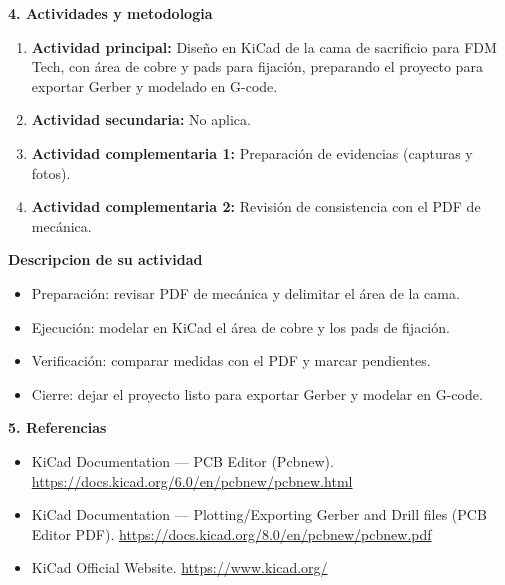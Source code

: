\documentclass[11pt,a4paper]{article}
\newcommand{\ActividadPrincipal}{Dise\~no en KiCad de la cama de sacrificio para FDM Tech, con \'area de cobre y pads para fijaci\'on, preparando el proyecto para exportar Gerber y modelado en G-code}
\newcommand{\ActividadSecundaria}{No aplica}
\newcommand{\SectionTitle}[1]{%
  \vspace{1mm}
  {\Large\bfseries\color{FDMblue}#1}\par
  \vspace{1mm}
}
\newcommand{\SubTitle}[1]{%
  {\bfseries\color{FDMdark}#1}\par
}
\newcommand{\SafeItem}{\Needspace{3\baselineskip}\item}
\newcommand{\SafeURL}{\url}
\begin{document}
\SectionTitle{4. Actividades y metodologia}
\begin{tcolorbox}[title=\textbf{\color{FDMblue}Actividades}]
\begin{enumerate}[leftmargin=*,itemsep=2pt]
  \SafeItem \textbf{Actividad principal:} \ActividadPrincipal.
  \SafeItem \textbf{Actividad secundaria:} \ActividadSecundaria.
  \SafeItem \textbf{Actividad complementaria 1:} Preparaci\'on de evidencias (capturas y fotos).
  \SafeItem \textbf{Actividad complementaria 2:} Revisi\'on de consistencia con el PDF de mec\'anica.
\end{enumerate}
\end{tcolorbox}

\begin{tcolorbox}[title=\textbf{\color{FDMblue}Metodologia}]
\SubTitle{Descripcion de su actividad}
\begin{itemize}[leftmargin=*,itemsep=2pt]
  \SafeItem Preparaci\'on: revisar PDF de mec\'anica y delimitar el \'area de la cama.
  \SafeItem Ejecuci\'on: modelar en KiCad el \'area de cobre y los pads de fijaci\'on.
  \SafeItem Verificaci\'on: comparar medidas con el PDF y marcar pendientes.
  \SafeItem Cierre: dejar el proyecto listo para exportar Gerber y modelar en G-code.
\end{itemize}
\end{tcolorbox}

\SectionTitle{5. Referencias}
\begin{tcolorbox}[title=\textbf{\color{FDMblue}Fuentes consultadas}]
\begin{itemize}[leftmargin=*,itemsep=2pt]
  \SafeItem KiCad Documentation — PCB Editor (Pcbnew). \SafeURL{https://docs.kicad.org/6.0/en/pcbnew/pcbnew.html}
  \SafeItem KiCad Documentation — Plotting/Exporting Gerber and Drill files (PCB Editor PDF). \SafeURL{https://docs.kicad.org/8.0/en/pcbnew/pcbnew.pdf}
  \SafeItem KiCad Official Website. \SafeURL{https://www.kicad.org/}
\end{itemize}
\end{tcolorbox}
\end{document}
